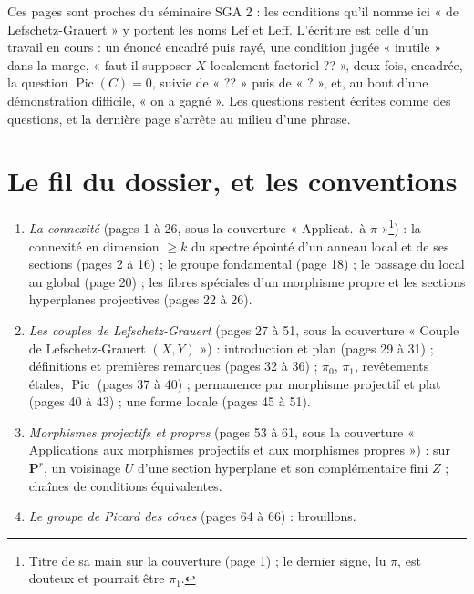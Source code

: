 \documentclass[11pt,a4paper]{article}
\begin{document}
\begin{resume}
Ces pages sont proches du séminaire SGA 2 :
les conditions qu'il nomme ici « de Lefschetz-Grauert » y portent les noms
$\mathrm{Lef}$ et $\mathrm{Leff}$. L'écriture est celle d'un travail en cours : un énoncé encadré puis rayé, une condition jugée «
inutile » dans la marge, « faut-il supposer $X$ localement factoriel ?? »,
deux fois, encadrée, la question
$\operatorname{Pic}(C) = 0$, suivie de « ?? » puis de « ? », et, au bout d'une démonstration difficile,
« on a gagné ». Les questions restent écrites comme des questions, et la
dernière page s'arrête au milieu d'une phrase.

\end{resume}

\section*{Le fil du dossier, et les conventions}

\begin{enumerate}
\item[I.] \emph{La connexité} (pages 1 à 26, sous la couverture « Applicat.\
à $\pi$ »\footnote{Titre de sa main sur la couverture (page 1) ; le dernier
signe, lu $\pi$, est douteux et pourrait être $\pi_1$.}) : la connexité en
dimension $\geq k$ du spectre épointé d'un anneau local et de ses sections
(pages 2 à 16) ; le groupe fondamental (page 18) ; le passage du local au
global (page 20) ; les fibres spéciales d'un morphisme propre et les sections
hyperplanes projectives (pages 22 à 26).
\item[II.] \emph{Les couples de Lefschetz-Grauert} (pages 27 à 51, sous la
couverture « Couple de Lefschetz-Grauert $(X, Y)$ ») : introduction et plan
(pages 29 à 31) ; définitions et premières remarques (pages 32 à 36) ;
$\pi_0$, $\pi_1$, revêtements étales, $\operatorname{Pic}$ (pages 37 à 40) ;
permanence par morphisme projectif et plat (pages 40 à 43) ; une forme locale
(pages 45 à 51).
\item[III.] \emph{Morphismes projectifs et propres} (pages 53 à 61, sous la
couverture « Applications aux morphismes projectifs et aux morphismes propres
») : sur $\mathbf{P}^r$, un voisinage $U$ d'une section hyperplane et son
complémentaire fini $Z$ ; chaînes de conditions équivalentes.
\item[IV.] \emph{Le groupe de Picard des cônes} (pages 64 à 66) : brouillons.
\end{enumerate}
\end{document}
